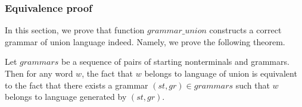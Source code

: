 %
%
%




\subsubsection{Equivalence proof}

In this section, we prove that function $grammar\_union$ constructs a correct grammar of union language indeed. Namely, we prove the following theorem.


\begin{theorem}\label{theorem-correct-union}
	Let $grammars$ be a sequence of pairs of starting nonterminals and grammars. Then for any word $w$, the fact that $w$ belongs to language of union is equivalent to the fact that there exists a grammar $(st,gr) \in grammars$ such that $w$ belongs to language generated by $(st,gr)$.
\end{theorem}

